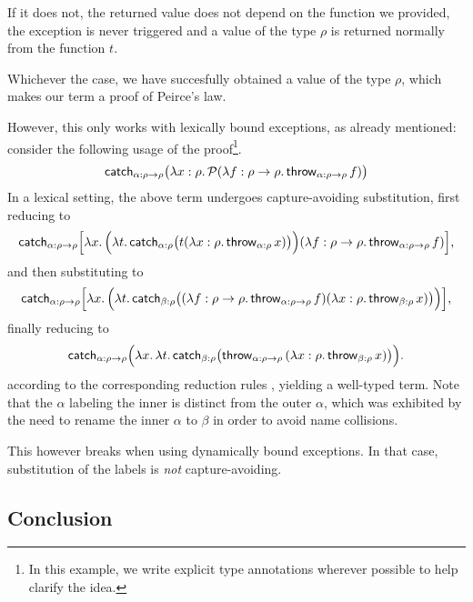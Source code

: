 If it does not, the returned value does not depend on the function we provided, the
exception is never triggered and a value of the type $\rho$ is returned normally from
the function $t$.

Whichever the case, we have succesfully obtained a value of the type $\rho$, which
makes our term a proof of Peirce's law.

However, this only works with lexically bound exceptions, as already mentioned:
consider the following usage of the proof\footnote{In this example, we write
explicit type annotations wherever possible to help clarify the idea.}.
\[ \mathsf{catch}_{\alpha : \rho \to \rho} \big(
	  \lambda x : \rho.\, \mathcal{P}(\lambda f : \rho \to \rho.\, \mathsf{throw}_{\alpha: \rho\to\rho} \, f)
   \big)
\]
In a lexical setting, the above term undergoes capture-avoiding substitution,
first reducing to
\[ \mathsf{catch}_{\alpha : \rho \to \rho} \Big[
	  \lambda x.\,
	  	\Big(\lambda t.\, \mathsf{catch}_{\alpha : \rho}
	  		\big(t (\lambda x : \rho.\, \mathsf{throw}_{\alpha : \rho}\, x)\big)\Big)
	  	(\lambda f : \rho \to \rho.\, \mathsf{throw}_{\alpha: \rho\to\rho} \, f)
   \Big]\text{,}
\]
and then substituting to
\[ \mathsf{catch}_{\alpha : \rho \to \rho} \Big[
	  \lambda x.\,
	  	\Big(\lambda t.\, \mathsf{catch}_{\beta : \rho}
	  		\big((\lambda f : \rho \to \rho.\, \mathsf{throw}_{\alpha: \rho\to\rho} \, f) (\lambda x : \rho.\, \mathsf{throw}_{\beta : \rho}\, x)\big)\Big)
   \Big]\text{,}
\]
finally reducing to
\[ \mathsf{catch}_{\alpha : \rho \to \rho} \Big(
	  \lambda x.\,\lambda t.\, \mathsf{catch}_{\beta : \rho}
	  		\big(\mathsf{throw}_{\alpha: \rho\to\rho}\,
	  		  (\lambda x : \rho.\, \mathsf{throw}_{\beta : \rho}\, x)
	\big)\Big)\text{.}
\]
according to the corresponding reduction rules \cite{krebbers11, parigot92}, yielding
a well-typed term. Note that the $\alpha$ labeling the inner  is distinct
from the outer $\alpha$, which was exhibited by the need to rename the inner $\alpha$
to $\beta$ in order to avoid name collisions.

This however breaks when using dynamically bound exceptions. In that case, substitution
of the labels is \emph{not} capture-avoiding.


\subsection{Conclusion}


